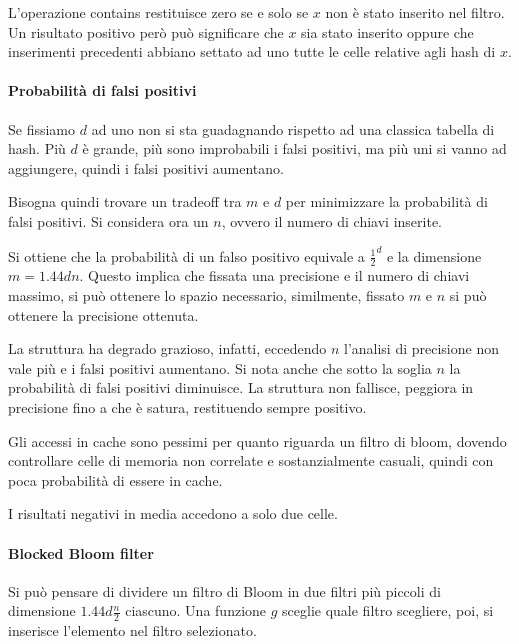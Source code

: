 L'operazione contains restituisce zero se e solo se $x$ non è stato inserito nel filtro. 
Un risultato positivo però può significare che $x$ sia stato inserito oppure che 
inserimenti precedenti abbiano settato ad uno tutte le celle relative agli hash di $x$.

\paragraph{Probabilità di falsi positivi}
Se fissiamo $d$ ad uno non si sta guadagnando rispetto ad una classica tabella di hash.
Più $d$ è grande, più sono improbabili i falsi positivi, ma più uni si vanno ad aggiungere, quindi i falsi positivi aumentano.

Bisogna quindi trovare un tradeoff tra $m$ e $d$ per minimizzare la probabilità di falsi positivi.
Si considera ora un $n$, ovvero il numero di chiavi inserite. 

Si ottiene che la probabilità di un falso positivo equivale a $\frac{1}{2}^d$ e la 
dimensione $m = 1.44 dn$. 
Questo implica che fissata una precisione e il numero di chiavi massimo, si può ottenere lo 
spazio necessario, similmente, fissato $m$ e $n$ si può ottenere la precisione ottenuta.

\begin{remark}
    La struttura ha degrado grazioso, infatti, eccedendo $n$ l'analisi di precisione non vale più e 
    i falsi positivi aumentano. Si nota anche che sotto la soglia $n$ la probabilità di falsi 
    positivi diminuisce. 
    La struttura non fallisce, peggiora in precisione fino a che è satura, restituendo sempre positivo.
\end{remark}
\begin{remark}
    Gli accessi in cache sono pessimi per quanto riguarda un filtro di bloom, 
    dovendo controllare celle di memoria non correlate e sostanzialmente casuali, 
    quindi con poca probabilità di essere in cache.
\end{remark}
\begin{remark}
    I risultati negativi in media accedono a solo due celle.
\end{remark}

\paragraph{Blocked Bloom filter}
Si può pensare di dividere un filtro di Bloom in due filtri più piccoli di dimensione $1.44d\frac{n}{2}$ ciascuno.
Una funzione $g$ sceglie quale filtro scegliere, poi, si inserisce l'elemento nel filtro selezionato.

